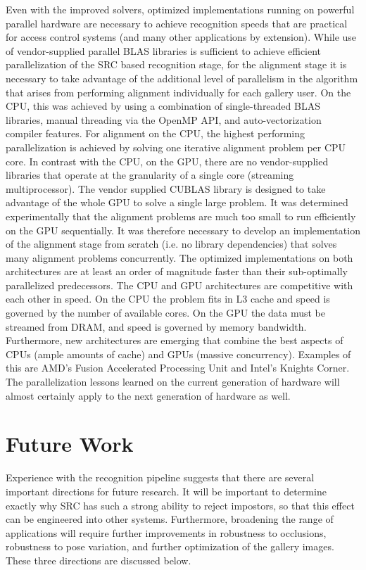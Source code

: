 Even with the improved solvers, optimized implementations running on powerful
parallel hardware are necessary to achieve recognition speeds that are
practical for access control systems (and many other applications by
extension).  While use of vendor-supplied parallel BLAS libraries is sufficient
to achieve efficient parallelization of the SRC based recognition stage, for
the alignment stage it is necessary to take advantage of the additional level
of parallelism in the algorithm that arises from performing alignment
individually for each gallery user.  On the CPU, this was achieved by using a
combination of single-threaded BLAS libraries, manual threading via the OpenMP
API, and auto-vectorization compiler features.  For alignment on the CPU, the
highest performing parallelization is achieved by solving one iterative
alignment problem per CPU core.  In contrast with the CPU, on the GPU, there
are no vendor-supplied libraries that operate at the granularity of a single
core (streaming multiprocessor).  The vendor supplied CUBLAS library is
designed to take advantage of the whole GPU to solve a single large problem.
It was determined experimentally that the alignment problems are much too small
to run efficiently on the GPU sequentially. It was therefore necessary to
develop an implementation of the alignment stage from scratch (i.e. no library
dependencies) that solves many alignment problems concurrently.  The optimized
implementations on both architectures are at least an order of magnitude faster
than their sub-optimally parallelized predecessors.  The CPU and GPU
architectures are competitive with each other in speed.  On the CPU the problem
fits in L3 cache and speed is governed by the number of available cores.  On
the GPU the data must be streamed from DRAM, and speed is governed by memory
bandwidth.  Furthermore, new architectures are emerging that combine the best
aspects of CPUs (ample amounts of cache) and GPUs (massive concurrency).
Examples of this are AMD's Fusion Accelerated Processing Unit and Intel's
Knights Corner.  The parallelization lessons learned on the current generation
of hardware will almost certainly apply to the next generation of hardware as
well.

\section{Future Work} Experience with the recognition pipeline suggests that there are
several important directions for future research.  It will be important to
determine exactly why SRC has such a strong ability to reject impostors, so
that this effect can be engineered into other systems.  Furthermore, broadening
the range of applications will require further improvements in robustness to
occlusions, robustness to pose variation, and further optimization of the
gallery images.  These three directions are discussed below.  

